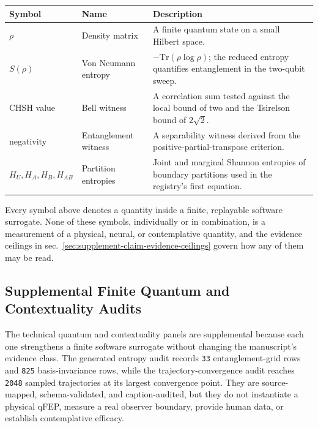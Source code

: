 \documentclass[
]{article}
\newcounter{none} %
\begin{document}
{\def\LTcaptype{none} %
\begin{longtable}[]{@{}
  >{\raggedright\arraybackslash}p{}
  >{\raggedright\arraybackslash}p{}
  >{\raggedright\arraybackslash}p{}@{}}
\toprule\noalign{}
\begin{minipage}[b]{\linewidth}\raggedright
Symbol
\end{minipage} & \begin{minipage}[b]{\linewidth}\raggedright
Name
\end{minipage} & \begin{minipage}[b]{\linewidth}\raggedright
Description
\end{minipage} \\
\midrule\noalign{}
\endhead
\bottomrule\noalign{}
\endlastfoot
\(\rho\) & Density matrix & A finite quantum state on a small Hilbert
space. \\
\(S(\rho)\) & Von Neumann entropy & \(-\mathrm{Tr}(\rho \log \rho)\);
the reduced entropy quantifies entanglement in the two-qubit sweep. \\
CHSH value & Bell witness & A correlation sum tested against the local
bound of two and the Tsirelson bound of \(2\sqrt{2}\). \\
negativity & Entanglement witness & A separability witness derived from
the positive-partial-transpose criterion. \\
\(H_U, H_A, H_B, H_{AB}\) & Partition entropies & Joint and marginal
Shannon entropies of boundary partitions used in the registry's first
equation. \\
\end{longtable}
}

Every symbol above denotes a quantity inside a finite, replayable
software surrogate. None of these symbols, individually or in
combination, is a measurement of a physical, neural, or contemplative
quantity, and the evidence ceilings in
sec.~\ref{sec:supplement-claim-evidence-ceilings} govern how any of them
may be read.

\subsection{Supplemental Finite Quantum and Contextuality
Audits}\label{sec:supplement-finite-quantum-contextuality-audits}

The technical quantum and contextuality panels are supplemental because
each one strengthens a finite software surrogate without changing the
manuscript's evidence class. The generated entropy audit records
\texttt{33} entanglement-grid rows and \texttt{825} basis-invariance
rows, while the trajectory-convergence audit reaches \texttt{2048}
sampled trajectories at its largest convergence point. They are
source-mapped, schema-validated, and caption-audited, but they do not
instantiate a physical qFEP, measure a real observer boundary, provide
human data, or establish contemplative efficacy.
\end{document}
